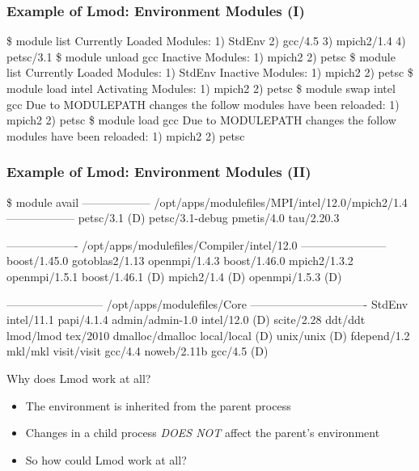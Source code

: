 \documentclass{beamer}
\begin{document}
\begin{frame}[fragile]
    \frametitle{Example of Lmod: Environment Modules (I)}
    {\tiny
\begin{semiverbatim}
{\color{blue}\$ module list}
Currently Loaded Modules:
  1) StdEnv  2) gcc/4.5  3) mpich2/1.4  4) petsc/3.1
{\color{blue}\$ module unload gcc}
Inactive Modules:
  1) mpich2  2) petsc
{\color{blue}\$ module list}
Currently Loaded Modules:
  1) StdEnv
Inactive Modules:
  1) mpich2  2) petsc
{\color{blue}\$ module load intel}
Activating Modules:
  1) mpich2  2) petsc
{\color{blue}\$ module swap intel gcc}
Due to MODULEPATH changes the follow modules have been reloaded:
  1) mpich2  2) petsc
{\color{blue}\$ module load gcc}
Due to MODULEPATH changes the follow modules have been reloaded:
  1) mpich2  2) petsc
\end{semiverbatim}
    }
\end{frame}

\begin{frame}[fragile]
    \frametitle{Example of Lmod: Environment Modules (II)}
    {\tiny
\begin{semiverbatim}
\$ {\color{blue} module avail}
------------------ /opt/apps/modulefiles/MPI/intel/12.0/mpich2/1.4 ------------------
  petsc/3.1 (D)    petsc/3.1-debug    pmetis/4.0    tau/2.20.3

------------------- /opt/apps/modulefiles/Compiler/intel/12.0 -----------------------
  boost/1.45.0        gotoblas2/1.13      openmpi/1.4.3
  boost/1.46.0        mpich2/1.3.2        openmpi/1.5.1
  boost/1.46.1 (D)    mpich2/1.4    (D)   openmpi/1.5.3   (D)

-------------------------- /opt/apps/modulefiles/Core -------------------------------
  StdEnv               intel/11.1         papi/4.1.4
  admin/admin-1.0      intel/12.0  (D)    scite/2.28
  ddt/ddt              lmod/lmod          tex/2010
  dmalloc/dmalloc      local/local (D)    unix/unix    (D)
  fdepend/1.2          mkl/mkl            visit/visit
  gcc/4.4              noweb/2.11b
  gcc/4.5        (D)
\end{semiverbatim}
    }
\end{frame}

\begin{frame}{Why does Lmod work at all?}
  \begin{itemize}
    \item The environment is inherited from the parent process
    \item Changes in a child process \emph{DOES NOT} affect the
      parent's environment
    \item So how could Lmod work at all?
  \end{itemize}
\end{frame}
\end{document}
